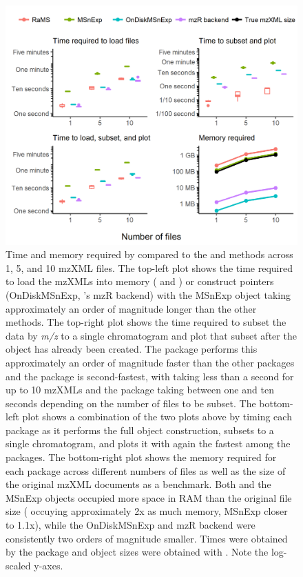 \begin{figure}[ht!]
    \includegraphics[]{speedsizecomp.png}
    \caption{Time and memory required by  compared to the  and  methods across 1, 5, and 10 mzXML files. The top-left plot shows the time required to load the mzXMLs into memory ( and ) or construct pointers (OnDiskMSnExp, 's mzR backend) with the MSnExp object taking approximately an order of magnitude longer than the other methods. The top-right plot shows the time required to subset the data by \emph{m/z} to a single chromatogram and plot that subset after the object has already been created. The  package performs this approximately an order of magnitude faster than the other packages and the  package is second-fastest, with  taking less than a second for up to 10 mzXMLs and the  package taking between one and ten seconds depending on the number of files to be subset. The bottom-left plot shows a combination of the two plots above by timing each package as it performs the full object construction, subsets to a single chromatogram, and plots it with  again the fastest among the packages. The bottom-right plot shows the memory required for each package across different numbers of files as well as the size of the original mzXML documents as a benchmark. Both  and the MSnExp objects occupied more space in RAM than the original file size ( occuying approximately 2x as much memory, MSnExp closer to 1.1x), while the OnDiskMSnExp and mzR backend were consistently two orders of magnitude smaller. Times were obtained by the  package and object sizes were obtained with . Note the log-scaled y-axes.}
    \label{fig:speedsizecomp}
\end{figure}


